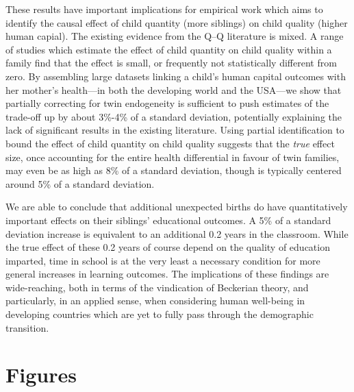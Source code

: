 \documentclass[subeqn]{article}
\begin{document}
\begin{spacing}{1.4}
These results have important implications for empirical work which aims to 
identify the causal effect of child quantity (more siblings) on child quality
(higher human capial).  The existing evidence from the Q--Q literature is 
mixed.  A range of studies which estimate the effect of child quantity on child 
quality within a family find that the effect is small, or frequently not 
statistically different from zero.  By assembling large datasets linking a 
child's human capital outcomes with her mother's health---in both the developing 
world and the USA---we show that partially correcting for twin endogeneity is 
sufficient to push estimates of the trade-off up by about 3\%-4\% of a standard 
deviation, potentially explaining the lack of significant results in the 
existing literature.  Using partial identification to bound the effect of child 
quantity on child quality suggests that the \emph{true} effect size, once 
accounting for the entire health differential in favour of twin families, may 
even be as high as 8\% of a standard deviation, though is typically centered
around 5\% of a standard deviation.

We are able to conclude that additional unexpected births do have
quantitatively important effects on their siblings' educational outcomes.  
A 5\% of a standard deviation increase is equivalent to an additional 0.2
years in the classroom.  While the true effect of these 0.2 years of course
depend on the quality of education imparted, time in school is at the very 
least a necessary condition for more general increases in learning outcomes.  
The implications of these findings are wide-reaching, both in terms of the 
vindication of Beckerian theory, and particularly, in an applied sense, when 
considering human well-being in developing countries which are yet to fully 
pass through the demographic transition.



\newpage
\section*{Figures}



\end{spacing}
\end{document}
